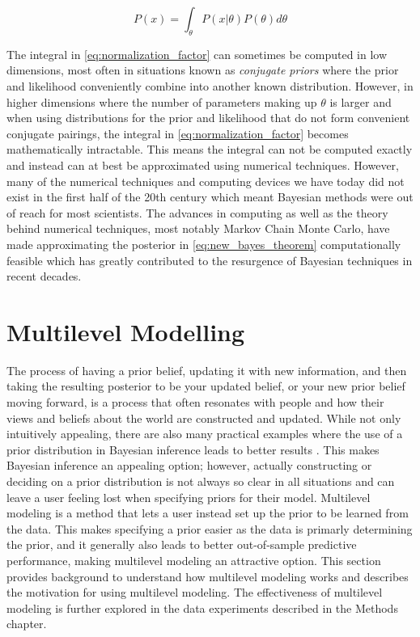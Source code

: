 \begin{equation} \label{eq:normalization_factor}
P(x) = \int_{\theta} P(x|\theta)P(\theta) d\theta
\end{equation}

The integral in \ref{eq:normalization_factor} can sometimes be computed in low dimensions, most often in situations known as \textit{conjugate priors} where the prior and likelihood conveniently combine into another known distribution. However, in higher dimensions where the number of parameters making up $\theta$ is larger and when using distributions for the prior and likelihood that do not form convenient conjugate pairings, the integral in \ref{eq:normalization_factor} becomes mathematically intractable. This means the integral can not be computed exactly and instead can at best be approximated using numerical techniques. However, many of the numerical techniques and computing devices we have today did not exist in the first half of the 20th century which meant Bayesian methods were out of reach for most scientists. The advances in computing as well as the theory behind numerical techniques, most notably Markov Chain Monte Carlo, have made approximating the posterior in \ref{eq:new_bayes_theorem} computationally feasible which has greatly contributed to the resurgence of Bayesian techniques in recent decades.

\section{Multilevel Modelling} \label{Multilevel_Modelling}

The process of having a prior belief, updating it with new information, and then taking the resulting posterior to be your updated belief, or your new prior belief moving forward, is a process that often resonates with people and how their views and beliefs about the world are constructed and updated. While not only intuitively appealing, there are also many practical examples where the use of a prior distribution in Bayesian inference leads to better results \cite{Schoot2021}. This makes Bayesian inference an appealing option; however, actually constructing or deciding on a prior distribution is not always so clear in all situations and can leave a user feeling lost when specifying priors for their model. Multilevel modeling is a method that lets a user instead set up the prior to be learned from the data. This makes specifying a prior easier as the data is primarly determining the prior, and it generally also leads to better out-of-sample predictive performance, making multilevel modeling an attractive option. This section provides background to understand how multilevel modeling works and describes the motivation for using multilevel modeling. The effectiveness of multilevel modeling is further explored in the data experiments described in the Methods chapter.


